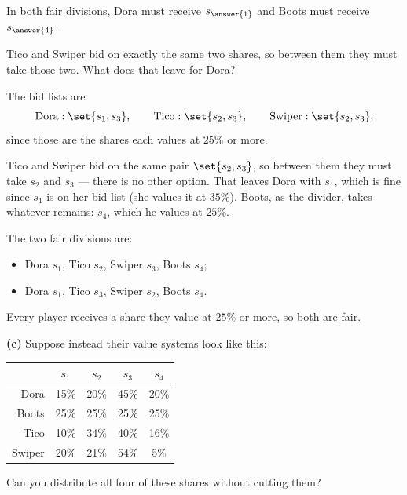 \documentclass[12pt]{ximera}
\begin{document}
\begin{problem}
\begin{prompt}
\smallskip
In both fair divisions, Dora must receive $s_{\answer{1}}$ and Boots must receive
$s_{\answer{4}}$.

\begin{hint}
Tico and Swiper bid on exactly the same two shares, so between them they must take
those two. What does that leave for Dora?
\end{hint}

\begin{feedback}
The bid lists are
\[
\text{Dora}: \set{s_1, s_3}, \qquad
\text{Tico}: \set{s_2, s_3}, \qquad
\text{Swiper}: \set{s_2, s_3},
\]
since those are the shares each values at $25\%$ or more.

Tico and Swiper bid on the same pair $\set{s_2, s_3}$, so between them they must take
$s_2$ and $s_3$ --- there is no other option. That leaves Dora with $s_1$, which is
fine since $s_1$ is on her bid list (she values it at $35\%$). Boots, as the divider,
takes whatever remains: $s_4$, which he values at $25\%$.

The two fair divisions are:
\begin{itemize}
\item Dora $s_1$, Tico $s_2$, Swiper $s_3$, Boots $s_4$;
\item Dora $s_1$, Tico $s_3$, Swiper $s_2$, Boots $s_4$.
\end{itemize}
Every player receives a share they value at $25\%$ or more, so both are fair.
\end{feedback}
\end{prompt}

\begin{prompt}
\textbf{(c)} Suppose instead their value systems look like this:

\begin{center}
\begin{tabular}{r|c|c|c|c|}
& $s_1$ & $s_2$ & $s_3$ & $s_4$ \\\hline
Dora   & 15\% & 20\% & 45\% & 20\% \\\hline
Boots  & 25\% & 25\% & 25\% & 25\% \\\hline
Tico   & 10\% & 34\% & 40\% & 16\% \\\hline
Swiper & 20\% & 21\% & 54\% &  5\% \\\hline
\end{tabular}
\end{center}

Can you distribute all four of these shares without cutting them?

\begin{multipleChoice}
\end{multipleChoice}


\end{prompt}
\end{problem}
\end{document}
